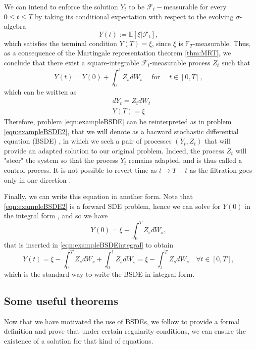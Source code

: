 We can intend to enforce the solution $Y_t$ to be $\mathcal{F}_t-$measurable for every $0 \leq t \leq T $ by taking its conditional expectation with respect to the evolving $\sigma$-algebra
\begin{equation}
	Y(t):=\mathbb{E}[\xi|\mathcal{F}_t],
\end{equation}
which satisfies the terminal condition $Y(T)=\xi$, since $\xi$ is $\mathbb{F}_T$-measurable. Thus, as a consequence of the Martingale representation theorem \ref{thm:MRT}, we conclude that there exist a square-integrable $\mathcal{F}_t$-measurable process $Z_t$ such that 
\begin{equation}
	\label{eqn:exampleBSDEintegral}
	Y(t)=Y(0)+\int_{0}^{t}Z_sdW_s\quad \text{ for } \quad t\in [0,T],
\end{equation}
which can be written as 
\begin{equation}
	\label{eqn:exampleBSDE2}
	\begin{split}
		&dY_t=Z_tdW_t\\
		&Y(T)=\xi
	\end{split}
\end{equation}
Therefore, problem \eqref{eqn:exampleBSDE} can be reinterpreted as in problem \eqref{eqn:exampleBSDE2}, that we will denote as a bacward stochastic differential equation (BSDE) , in which we seek a pair of processes $(Y_t,Z_t)$ that will provide an adapted solution to our original problem. Indeed, the process $Z_t$ will "steer" the system so that the process $Y_t$ remains adapted, and is thus called a control process. It is not possible to revert time as $t\to T-t$ as the filtration goes only in one direction \cite{chessari_numerical_2022}.

Finally, we can write this equation in another form. Note that \eqref{eqn:exampleBSDE2} is a forward SDE problem, hence we can solve for $Y(0)$ in the integral form , and so we have
\begin{equation}
	Y(0)=\xi-\int_{0}^{T}Z_sdW_s,
\end{equation}
that is inserted in \eqref{eqn:exampleBSDEintegral} to obtain
\begin{equation}
	Y(t)=\xi-\int_{0}^{T}Z_sdW_s+\int_{0}^{t}Z_sdW_s=\xi -\int_{t}^{T}Z_sdW_s \quad \forall t\in[0,T],
\end{equation}
which is the standard way to write the BSDE in integral form.
\subsection{Some useful theorems}
Now that we have motivated the use of BSDEs, we follow \cite{pham_continuous-time_2009} to provide a formal definition and prove that under certain regularity conditions, we can ensure the existence of a solution for that kind of equations.

